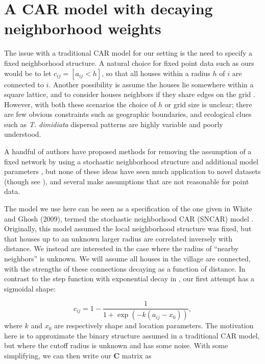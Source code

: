 \documentclass{scrartcl}
\newcommand{\mat}[1]{\bm{#1}}
\begin{document}
\section{A CAR model with decaying neighborhood weights}
\label{sec:decaying-weights-car}

The issue with a traditional CAR model for our setting is the need to
specify a fixed neighborhood structure. A natural choice for fixed
point data such as ours would be to let $c_{ij} = [a_{ij} < h]$, so
that all houses within a radius $h$ of $i$ are connected to
$i$. Another possibility is assume the houses lie somewhere within a
square lattice, and to consider houses neighbors if they share edges
on the grid \cite{Paciorek2013}. However, with both these scenarios
the choice of $h$ or grid size is unclear; there are few obvious
constraints such as geographic boundaries, and ecological clues such
as \textit{T. dimidiata} dispersal patterns are highly variable and
poorly understood.

A handful of authors have proposed methods for removing the assumption
of a fixed network by using a stochastic neighborhood structure and
additional model parameters \cite{Gao2019, Rodrigues2012}, but none of
these ideas have seen much application to novel datasets (though see
\cite{Whittle2020}), and several make assumptions that are not
reasonable for point data.

The model we use here can be seen as a specification of the one given
in White and Ghosh (2009), termed the stochastic neighborhood CAR
(SNCAR) model \cite{White2009}. Originally, this model assumed the
local neighborhood structure was fixed, but that houses up to an
unknown larger radius are correlated inversely with distance. We
instead are interested in the case where the radius of ``nearby
neighbors'' is unknown. We will assume all houses in the village are
connected, with the strengths of these connections decaying as a
function of distance. In contrast to the step function with
exponential decay in \cite{White2009}, our first attempt has a
sigmoidal shape:

\begin{equation}
  \label{eq:decay-func}
  c_{ij} = 1 - \frac{1}{1 + \exp(-k (a_{ij} - x_0))},
\end{equation}
where $k$ and $x_0$ are respectively shape and location
parameters. The motivation here is to approximate the binary structure
assumed in a traditional CAR model, but where the cutoff radius is
unknown and has some noise. With some simplifying, we can then write
our $\mat{C}$ matrix as
\end{document}
